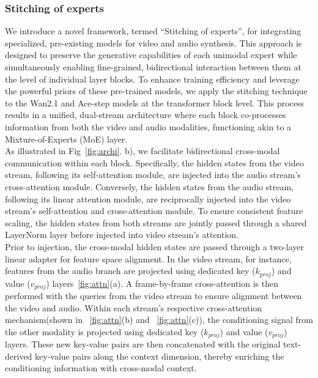 \subsubsection{Stitching of experts} We introduce a novel framework, termed ``Stitching of experts'', for integrating specialized, pre-existing models for video and audio synthesis. This approach is designed to preserve the generative capabilities of each unimodal expert while simultaneously enabling fine-grained, bidirectional interaction between them at the level of individual layer blocks. To enhance training efficiency and leverage the powerful priors of these pre-trained models, we apply the stitching technique to the Wan2.1 and Ace-step models at the transformer block level. This process results in a unified, dual-stream architecture where each block co-processes information from both the video and audio modalities, functioning akin to a Mixture-of-Experts (MoE) layer. \\
As illustrated in Fig~\ref{fig:archi}. b), we facilitate bidirectional cross-modal communication within each block. Specifically, the hidden states from the video stream, following its self-attention module, are injected into the audio stream's cross-attention module. Conversely, the hidden states from the audio stream, following its linear attention module, are reciprocally injected into the video stream's self-attention and cross-attention module. To ensure consistent feature scaling, the hidden states from both streams are jointly passed through a shared LayerNorm layer before injected into video stream's attention.\\
Prior to injection, the cross-modal hidden states are passed through a two-layer linear adapter for feature space alignment. In the video stream, for instance, features from the audio branch are projected using dedicated key ($k_{proj}$) and value ($v_{proj}$) layers~\ref{fig:attn}(a). A frame-by-frame cross-attention is then performed with the queries from the video stream to ensure alignment between the video and audio. Within each stream's respective cross-attention mechanism(shown in ~\ref{fig:attn}(b) and ~\ref{fig:attn}(c)), the conditioning signal from the other modality is projected using dedicated key ($k_{proj}$) and value ($v_{proj}$) layers. These new key-value pairs are then concatenated with the original text-derived key-value pairs along the context dimension, thereby enriching the conditioning information with cross-modal context.
